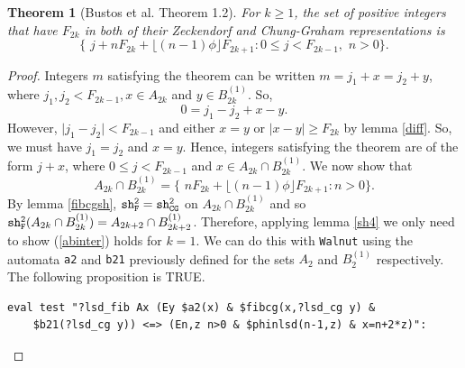\documentclass[12pt]{article}
\theoremstyle{plain}
\newtheorem{theorem}{Theorem}
\theoremstyle{case}
\theoremstyle{definition}
\begin{document}
\bigskip

\begin{theorem}[Bustos et al. \cite{Bustos:2025aa} Theorem 1.2]
For $k \geq 1$, the set of positive integers that have $F_{2k}$ in both of their Zeckendorf and Chung-Graham representations is 
$$
\{ \,\, j + n F_{2k} + \lfloor (n-1) \phi \rfloor F_{2k+1} : 0 \leq j < F_{2k-1} , \,\, n > 0  \} .
$$
\end{theorem}
\begin{proof}
Integers $m$ satisfying the theorem can be written $m = j_1 + x = j_2 + y$, where $j_1, j_2 <  F_{2k-1}, x \in A_{2k}$ and $y \in B_{2k}^{(1)}$. So,
$$
0 = j_1 - j_2 + x - y .
$$
However, $\mid j_1 - j_2 \mid < F_{2k-1}$ and either $x = y$ or $\mid x - y \mid \geq F_{2k}$ by lemma \ref{diff}. So, we must have $j_1 = j_2$ and $x = y$. Hence, integers satisfying the theorem are of the form $j + x$, where $0 \leq j < F_{2k-1}$ and $x \in A_{2k} \cap B_{2k}^{(1)}$. We now show that 
\begin{equation}
\label{abinter}
A_{2k} \cap B_{2k}^{(1)}  = \{ \,\, n F_{2k} + \lfloor (n-1) \phi \rfloor F_{2k+1} : n > 0  \} .
\end{equation}
By lemma \ref{fibcgsh}, ${\tt sh_F^2} = {\tt sh_{CG}^2}$ on $A_{2k} \cap B_{2k}^{(1)}$ and so ${\tt sh_F^2} (A_{2k} \cap B_{2k}^{(1)}) = A_{2k+2} \cap B_{2k+2}^{(1)}$. Therefore, applying lemma \ref{sh4} we only need to show (\ref{abinter}) holds for $k=1$. We can do this with {\tt Walnut} using the automata {\tt a2} and {\tt b21} previously defined for the sets $A_{2}$ and $B_{2}^{(1)}$ respectively. The following proposition is TRUE.
\begin{verbatim}
eval test "?lsd_fib Ax (Ey $a2(x) & $fibcg(x,?lsd_cg y) & 
    $b21(?lsd_cg y)) <=> (En,z n>0 & $phinlsd(n-1,z) & x=n+2*z)":
\end{verbatim}
\end{proof}

\bigskip


\begin{small}

\end{small}
\end{document}
